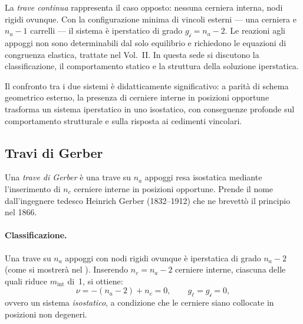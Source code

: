 La \emph{trave continua} rappresenta il caso opposto: nessuna
cerniera interna, nodi rigidi ovunque. Con la configurazione
minima di vincoli esterni --- una cerniera e $n_a - 1$ carrelli
--- il sistema è iperstatico di grado $g_{\mathscr{i}} = n_a - 2$.
Le reazioni agli appoggi non sono determinabili dal solo equilibrio
e richiedono le equazioni di congruenza elastica, trattate nel
Vol.~II. In questa sede si discutono la classificazione, il
comportamento statico e la struttura della soluzione iperstatica.

Il confronto tra i due sistemi è didatticamente significativo:
a parità di schema geometrico esterno, la presenza di cerniere
interne in posizioni opportune trasforma un sistema iperstatico
in uno isostatico, con conseguenze profonde sul comportamento
strutturale e sulla risposta ai cedimenti vincolari.


\subsection{Travi di Gerber}
\label{subsec:gerber}

Una \emph{trave di Gerber} è una trave su $n_a$ appoggi resa
isostatica mediante l'inserimento di $n_c$ cerniere interne in
posizioni opportune. Prende il nome dall'ingegnere tedesco
Heinrich Gerber (1832--1912) che ne brevettò il principio nel 1866.

\paragraph{Classificazione.}

Una trave su $n_a$ appoggi con nodi rigidi ovunque è iperstatica
di grado $n_a - 2$ (come si mostrerà nel ). Inserendo $n_c = n_a - 2$
cerniere interne, ciascuna delle quali riduce $m_{\text{int}}$
di~1, si ottiene:
\begin{equation}\label{eq:class_gerber}
\nu = -(n_a - 2) + n_c = 0, \qquad
g_\ell = g_{\mathscr{i}} = 0,
\end{equation}
ovvero un sistema \emph{isostatico}, a condizione
che le cerniere siano collocate in posizioni non
degeneri.

